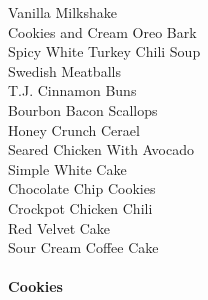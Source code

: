 \documentclass[11pt, twoside, openany]{book}
\begin{document}
Vanilla Milkshake\hrulefill\pageref{vanilla-milkshake}\\
Cookies and Cream Oreo Bark\hrulefill\pageref{cookies-and-cream-oreo-bark}\\
Spicy White Turkey Chili Soup\hrulefill\pageref{spicy-white-turkey-chili-soup}\\
Swedish Meatballs\hrulefill\pageref{swedish-meatballs}\\
T.J. Cinnamon Buns\hrulefill\pageref{t.j.-cinnamon-buns}\\
Bourbon Bacon Scallops\hrulefill\pageref{bourbon-bacon-scallops}\\
Honey Crunch Cerael\hrulefill\pageref{honey-crunch-cerael}\\
Seared Chicken With Avocado\hrulefill\pageref{seared-chicken-with-avocado}\\
Simple White Cake\hrulefill\pageref{simple-white-cake}\\
Chocolate Chip Cookies\hrulefill\pageref{chocolate-chip-cookies}\\
Crockpot Chicken Chili\hrulefill\pageref{crockpot-chicken-chili}\\
Red Velvet Cake\hrulefill\pageref{red-velvet-cake}\\
Sour Cream Coffee Cake\hrulefill\pageref{sour-cream-coffee-cake}\\
{\\\Large \textbf{Cookies}}\hfill\textbf{\pageref{cookies}}
\end{document}

